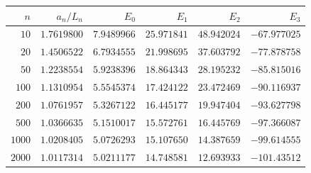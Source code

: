 \begin{tabular}{rrrrrr}
\toprule
$n$ & $a_n/L_n$ & $E_0$ & $E_1$ & $E_2$ & $E_3$ \\
\midrule
$10$ & $1.7619800$ & $7.9489966$ & $25.971841$ & $48.942024$ & $-67.977025$ \\
$20$ & $1.4506522$ & $6.7934555$ & $21.998695$ & $37.603792$ & $-77.878758$ \\
$50$ & $1.2238554$ & $5.9238396$ & $18.864343$ & $28.195232$ & $-85.815016$ \\
$100$ & $1.1310954$ & $5.5545374$ & $17.424122$ & $23.472469$ & $-90.116937$ \\
$200$ & $1.0761957$ & $5.3267122$ & $16.445177$ & $19.947404$ & $-93.627798$ \\
$500$ & $1.0366635$ & $5.1510017$ & $15.572761$ & $16.445769$ & $-97.366087$ \\
$1000$ & $1.0208405$ & $5.0726293$ & $15.107650$ & $14.387659$ & $-99.614555$ \\
$2000$ & $1.0117314$ & $5.0211177$ & $14.748581$ & $12.693933$ & $-101.43512$ \\
\bottomrule
\end{tabular}
